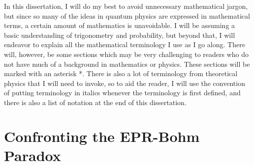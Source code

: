 \documentclass[12pt]{report}
\begin{document}
In this dissertation, I will do my best to avoid unnecessary mathematical jargon, but since so many of the ideas in quantum physics are expressed in mathematical terms, a certain amount of mathematics is unavoidable. I will be assuming a basic understanding of trigonometry and probability, but beyond that, I will endeavor to explain all the mathematical terminology I use as I go along. There will, however, be some sections which may be very challenging to readers who do not have much of a background in mathematics or physics. These sections will be marked with an asterisk *.\label{asteriskmeaning} There is also a lot of terminology from theoretical physics that I will need to invoke, so to aid the reader, I will use the convention of putting terminology in italics whenever the terminology is first defined, and there is also a list of notation at the end of this dissertation.

\newpage 

    \chapter{Confronting the EPR-Bohm Paradox\label{BellChapter}}
    
\end{document}
